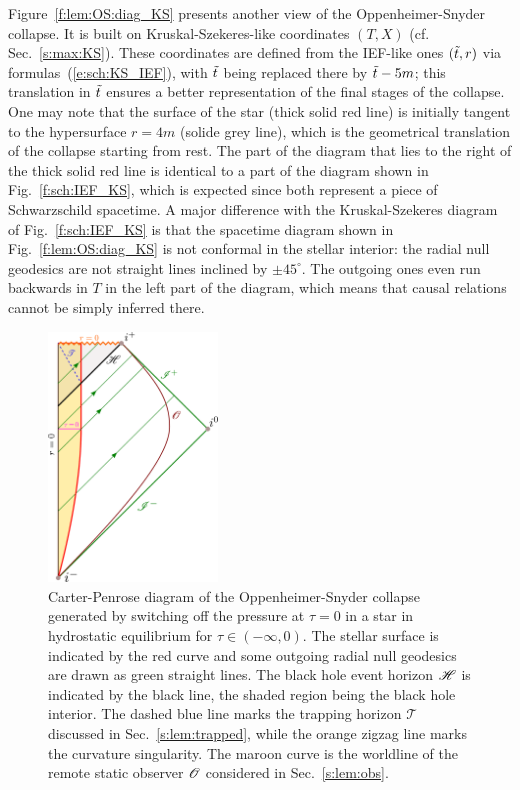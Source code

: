 Figure~\ref{f:lem:OS:diag_KS} presents another view of the Oppenheimer-Snyder collapse.
It is built on Kruskal-Szekeres-like coordinates
$(T,X)$ (cf. Sec.~\ref{s:max:KS}). These coordinates are defined from the IEF-like ones $({\tilde t}, r)$ via formulas~(\ref{e:sch:KS_IEF}), with ${\tilde t}$ being replaced there by ${\tilde t} - 5 m$; this
translation in ${\tilde t}$ ensures a better representation of the final
stages of the collapse. One may note that the surface of the star (thick solid red line) is initially
tangent to the hypersurface $r=4 m$ (solide grey line), which is the geometrical translation
of the collapse starting from rest. The part of the diagram that lies to the right of the
thick solid red line is identical to a part of the diagram shown in Fig.~\ref{f:sch:IEF_KS}, which
is expected since both represent a piece of Schwarzschild spacetime. A major difference with
the Kruskal-Szekeres diagram of Fig.~\ref{f:sch:IEF_KS} is that the spacetime diagram shown
in Fig.~\ref{f:lem:OS:diag_KS} is not conformal in the stellar interior: the radial null geodesics
are not straight lines inclined by $\pm 45^\circ$. The outgoing ones even run backwards in $T$
in the left part of the diagram, which means that causal relations cannot be simply inferred there.


\begin{figure}
\centerline{\includegraphics[width=0.4\textwidth]{lem_OS_CP_diag.pdf}}
\caption[]{\label{f:lem:OS:CP_diag} \footnotesize
Carter-Penrose diagram of the Oppenheimer-Snyder collapse generated
by switching off the pressure at $\tau=0$ in a star
in hydrostatic equilibrium for $\tau \in (-\infty,0)$.
The stellar surface is indicated by the red curve and some outgoing radial
null geodesics are drawn as green straight lines.
The black hole event horizon $\mathscr{H}$ is indicated by
the black line, the shaded region being the black hole interior.
The dashed blue line marks the trapping horizon
$\mathscr{T}$ discussed in Sec.~\ref{s:lem:trapped},
while the orange zigzag line marks the curvature singularity.
The maroon curve is the worldline of the remote
static observer $\mathscr{O}$ considered in Sec.~\ref{s:lem:obs}.
}
\end{figure}

